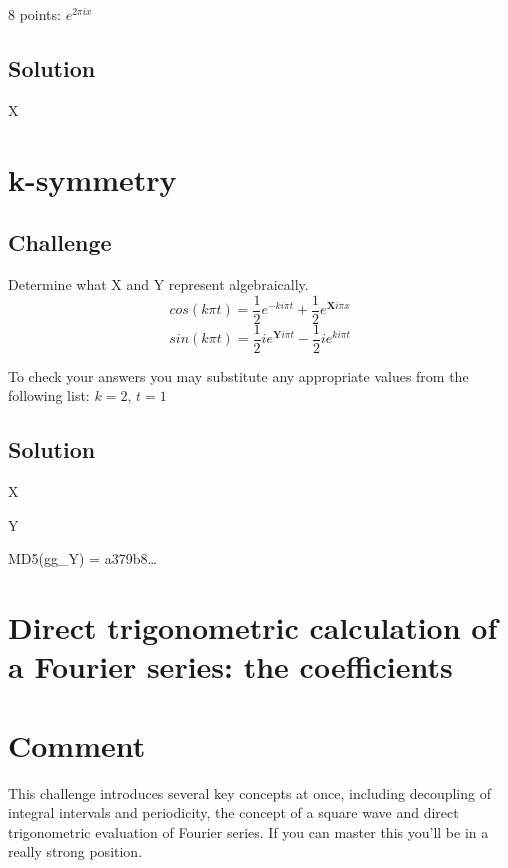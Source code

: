 8 points: $e^{2 \pi i x}$

\subsection*{Solution}
X





\newpage
\section{k-symmetry}

\subsection*{Challenge}
Determine what X and Y represent algebraically.
\begin{equation}
    cos(k \pi t) = \frac{1}{2} e^{-k i\pi t} + \frac{1}{2} e^{\bm{X} i \pi x}
\end{equation}
\begin{equation}
    sin(k \pi t) = \frac{1}{2} i e^{\bm{Y} i \pi t} - \frac{1}{2} i e^{k i \pi t}
\end{equation}

To check your answers you may substitute any appropriate values from the following list: $k=2$, $t=1$

\subsection*{Solution}
X


Y

MD5(gg\_Y) = a379b8\ldots




\newpage
\section{Direct trigonometric calculation of a Fourier series: the coefficients}
\label{sec:fs_squarewave}

\section*{Comment}
This challenge introduces several key concepts at once, including decoupling of integral intervals and periodicity, the concept of a square wave and direct trigonometric evaluation of Fourier series. If you can master this you'll be in a really strong position.

